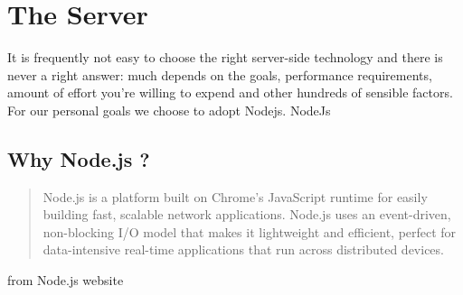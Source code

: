 \documentclass[a4paper,13pt]{report}
\begin{document}
\chapter{The Server}
        It is frequently not easy to choose the right server-side technology and there is never a right answer: much depends on the goals, performance requirements, amount of effort you're willing to expend and other hundreds of sensible factors.
        For our personal goals we choose to adopt Nodejs.\newline
        NodeJs
    \section {Why Node.js ?}
        \begin{quotation}
        Node.js is a platform built on Chrome's JavaScript runtime for easily building fast, scalable network applications. Node.js uses an event-driven, non-blocking I/O model that makes it lightweight and efficient, perfect for data-intensive real-time applications that run across distributed devices.
        \end{quotation}
        \begin{flushright}
          from Node.js website \cite{node}
        \end{flushright}
\end{document}
